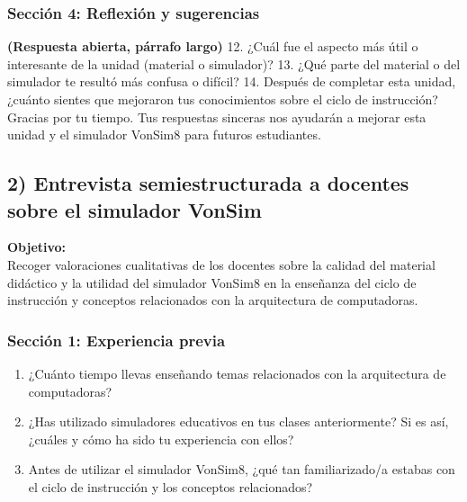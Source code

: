\documentclass[12pt,oneside]{templates/unerthesis}
\begin{document}
\hypertarget{secciuxf3n-4-reflexiuxf3n-y-sugerencias}{%
\subsubsection{Sección 4: Reflexión y sugerencias}\label{secciuxf3n-4-reflexiuxf3n-y-sugerencias}}

\textbf{(Respuesta abierta, párrafo largo)}
12. ¿Cuál fue el aspecto más útil o interesante de la unidad (material o simulador)?
13. ¿Qué parte del material o del simulador te resultó más confusa o difícil?
14. Después de completar esta unidad, ¿cuánto sientes que mejoraron tus conocimientos sobre el ciclo de instrucción?
Gracias por tu tiempo. Tus respuestas sinceras nos ayudarán a mejorar esta unidad y el simulador VonSim8 para futuros estudiantes.

\hypertarget{entrevista-semiestructurada-a-docentes-sobre-el-simulador-vonsim}{%
\subsection{2) Entrevista semiestructurada a docentes sobre el simulador VonSim}\label{entrevista-semiestructurada-a-docentes-sobre-el-simulador-vonsim}}

\textbf{Objetivo:}\\
Recoger valoraciones cualitativas de los docentes sobre la calidad del material didáctico y la utilidad del simulador VonSim8 en la enseñanza del ciclo de instrucción y conceptos relacionados con la arquitectura de computadoras.

\hypertarget{secciuxf3n-1-experiencia-previa-1}{%
\subsubsection{Sección 1: Experiencia previa}\label{secciuxf3n-1-experiencia-previa-1}}

\begin{enumerate}
\def\labelenumi{\arabic{enumi}.}
\item
  ¿Cuánto tiempo llevas enseñando temas relacionados con la arquitectura de computadoras?
\item
  ¿Has utilizado simuladores educativos en tus clases anteriormente? Si es así, ¿cuáles y cómo ha sido tu experiencia con ellos?
\item
  Antes de utilizar el simulador VonSim8, ¿qué tan familiarizado/a estabas con el ciclo de instrucción y los conceptos relacionados?
\end{enumerate}
\end{document}

